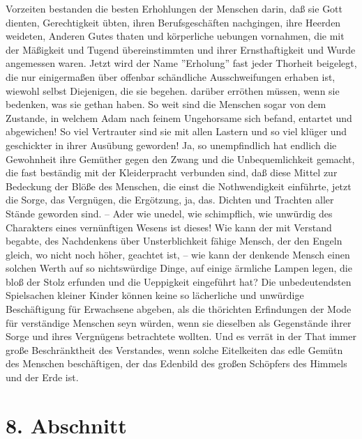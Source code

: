 Vorzeiten bestanden die besten Erhohlungen der Menschen darin, daß sie Gott
dienten, Gerechtigkeit übten, ihren Berufsgeschäften nachgingen, ihre Heerden
weideten, Anderen Gutes thaten und körperliche uebungen vornahmen, die mit der
Mäßigkeit und Tugend übereinstimmten und ihrer Ernsthaftigkeit und Wurde
angemessen waren. Jetzt wird der Name ''Erholung'' fast jeder Thorheit
beigelegt, die nur einigermaßen über offenbar schändliche Ausschweifungen
erhaben ist, wiewohl selbst Diejenigen, die sie begehen. darüber erröthen
müssen, wenn sie bedenken, was sie gethan haben. So weit sind die Menschen sogar
von dem Zustande, in welchem Adam nach feinem Ungehorsame sich befand, entartet
und abgewichen! So viel Vertrauter sind sie mit allen Lastern und so viel klüger
und geschickter in ihrer Ausübung geworden! Ja, so unempfindlich hat endlich die
Gewohnheit ihre Gemüther gegen den Zwang und die Unbequemlichkeit gemacht, die
fast beständig mit der Kleiderpracht verbunden sind, daß diese Mittel zur
Bedeckung der Blöße des Menschen, die einst die Nothwendigkeit einführte, jetzt
die Sorge, das Vergnügen, die Ergötzung, ja, das. Dichten und Trachten aller
Stände geworden sind. -- Ader wie unedel, wie schimpflich, wie unwürdig des
Charakters eines vernünftigen Wesens ist dieses! Wie kann der mit Verstand
begabte, des Nachdenkens über Unsterblichkeit fähige Mensch, der den Engeln
gleich, wo nicht noch höher, geachtet ist, -- wie kann der denkende Mensch einen
solchen Werth auf so nichtswürdige Dinge, auf einige ärmliche Lampen legen, die
bloß der Stolz erfunden und die Ueppigkeit eingeführt hat? Die unbedeutendsten
Spielsachen kleiner Kinder können keine so lächerliche und unwürdige
Beschäftigung für Erwachsene abgeben, als die thörichten Erfindungen der Mode
für verständige Menschen seyn würden, wenn sie dieselben als Gegenstände ihrer
Sorge und ihres Vergnügens betrachtete wollten. Und es verrät in der That immer
große Beschränktheit des Verstandes, wenn solche Eitelkeiten das edle Gemütn des
Menschen beschäftigen, der das Edenbild des großen Schöpfers des Himmels und der
Erde ist.

\section{8. Abschnitt}

